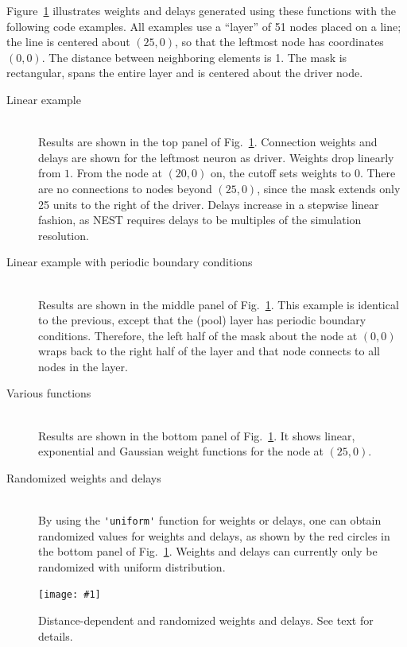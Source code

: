 \documentclass[a4paper,12pt]{report}
\newcommand{\scriptfig}[4]{%
\begin{figure}
\centerline{\texttt{[image: \#1]}}
\caption[#3]{#4}
\label{fig:#1}
\end{figure}%
}
\begin{document}
Figure~\ref{fig:conn5} illustrates weights and delays generated using
these functions with the following code examples. All examples use a
``layer'' of 51 nodes placed on a line; the line is centered about
$(25,0)$, so that the leftmost node has coordinates $(0,0)$. The distance between
neighboring elements is 1. The mask is rectangular, spans the
entire layer and is centered about the driver node.
\begin{description}
\item[Linear example] \rule{0mm}{0mm}\\

Results are shown in the top panel of Fig.~\ref{fig:conn5}.
Connection weights and delays are shown for the leftmost neuron as
driver. Weights drop linearly from $1$. From the node at $(20,0)$ on,
the cutoff sets weights to 0. There are no connections to nodes beyond
$(25,0)$, since the mask extends only 25 units to the right of the
driver. Delays increase in a stepwise linear fashion, as NEST requires
delays to be multiples of the simulation resolution.
\item[Linear example with periodic boundary conditions]\rule{0mm}{0mm}\\

Results are shown in the middle panel of Fig.~\ref{fig:conn5}.
This example is identical to the previous,
  except that the (pool) layer has periodic boundary
  conditions. Therefore, the left half of the mask about the node at
  $(0,0)$ wraps back to the right half of the layer and that node
  connects to all nodes in the layer.
\item[Various functions]\rule{0mm}{0mm}\\


Results are shown in the bottom panel of Fig.~\ref{fig:conn5}. It
shows linear, exponential and Gaussian weight functions for the node
at $(25,0)$.
\item[Randomized weights and delays] \rule{0mm}{0mm}\\

By using the \lstinline!'uniform'! function for weights or delays, one
can obtain randomized values for weights and delays, as shown by the
red circles in the bottom panel of Fig.~\ref{fig:conn5}. Weights and
delays can currently only be randomized with uniform distribution.
\end{description}
\scriptfig{conn5}{0.9}{Distance-dependent and randomized weights and
  delays}%
{Distance-dependent and randomized weights and delays. See text for details.}
\end{document}
